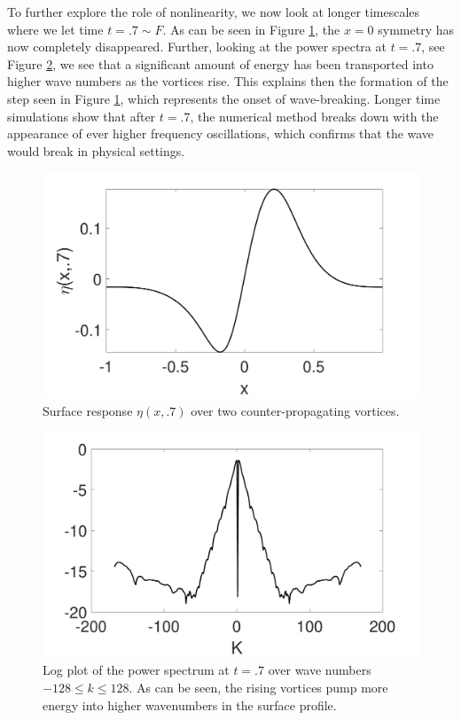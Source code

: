 \documentclass[a4paper,11pt]{article}
\begin{document}
To further explore the role of nonlinearity, we now look at longer timescales where we let time $t = .7 \sim F$.  As can be seen in Figure \ref{fig:surfrep}, the $x=0$ symmetry has now completely disappeared.  Further, looking at the power spectra at $t=.7$, see Figure \ref{fig:pspec3}, we see that a significant amount of energy has been transported into higher wave numbers as the vortices rise.  This explains then the formation of the step seen in Figure \ref{fig:surfrep}, which represents the onset of wave-breaking.  Longer time simulations show that after $t=.7$, the numerical method breaks down with the appearance of ever higher frequency oscillations, which confirms that the wave would break in physical settings.  
\begin{figure}[!h]
\centering
\includegraphics[width=.75\textwidth]{surf_resp_mu_pt2_F_1_tf_pt7}
\caption{Surface response $\eta(x,.7)$ over two counter-propagating vortices.}
\label{fig:surfrep}
\end{figure}
\begin{figure}[!h]
\centering
\includegraphics[width=.75\textwidth]{pspec_mu_pt2_F_1_tf_pt7}
\caption{Log plot of the power spectrum at $t = .7$ over wave numbers $-128\leq k \leq 128$.  As can be seen, the rising vortices pump more energy into higher wavenumbers in the surface profile.}
\label{fig:pspec3}
\end{figure}
\end{document}
